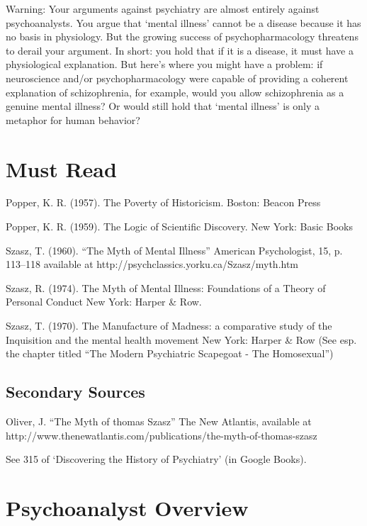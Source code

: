 \begin{refsection}
Warning: Your arguments against psychiatry are almost entirely against psychoanalysts. You argue that `mental illness' cannot be a disease because it has no basis in physiology. But the growing success of psychopharmacology threatens to derail your argument. In short: you hold that if it is a disease, it must have a physiological explanation. But here's where you might have a problem: if neuroscience and\slash or psychopharmacology were capable of providing a coherent explanation of schizophrenia, for example, would you allow schizophrenia as a genuine mental illness? Or would still hold that `mental illness' is only a metaphor for human behavior?

\section{Must Read}
\label{mustread}

Popper, K. R. (1957). The Poverty of Historicism. Boston: Beacon Press

Popper, K. R. (1959). The Logic of Scientific Discovery. New York: Basic Books

Szasz, T. (1960). ``The Myth of Mental Illness'' American Psychologist, 15, p. 113--118 available at http:\slash \slash psychclassics.yorku.ca\slash Szasz\slash myth.htm

Szasz, R. (1974). The Myth of Mental Illness: Foundations of a Theory of Personal Conduct New York: Harper \& Row.

Szasz, T. (1970). The Manufacture of Madness: a comparative study of the Inquisition and the mental health movement New York: Harper \& Row (See esp. the chapter titled ``The Modern Psychiatric Scapegoat - The Homosexual'')

\subsection{Secondary Sources}
\label{secondarysources}

Oliver, J. ``The Myth of thomas Szasz'' The New Atlantis, available at http:\slash \slash www.thenewatlantis.com\slash publications\slash the-myth-of-thomas-szasz

See 315 of `Discovering the History of Psychiatry' (in Google Books).

\pagebreak 

\section{Psychoanalyst Overview}
\label{psychoanalystoverview}


\end{refsection}
